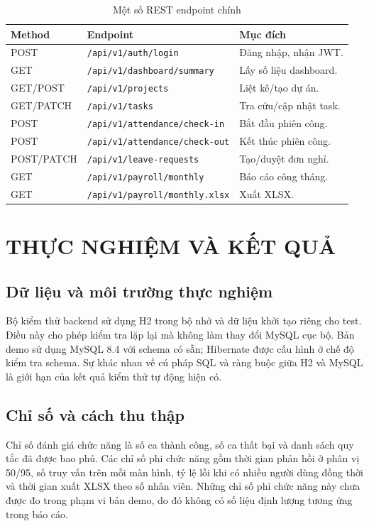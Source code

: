 \documentclass[12pt,a4paper,oneside]{report}
\newcommand{\code}[1]{\texttt{#1}}
\begin{document}
\begin{table}[H]\centering\caption{Một số REST endpoint chính}
\begin{tabularx}{\textwidth}{p{2cm}p{6cm}X}\toprule\textbf{Method}&\textbf{Endpoint}&\textbf{Mục đích}\\\midrule
POST&\code{/api/v1/auth/login}&Đăng nhập, nhận JWT.\\
GET&\code{/api/v1/dashboard/summary}&Lấy số liệu dashboard.\\
GET/POST&\code{/api/v1/projects}&Liệt kê/tạo dự án.\\
GET/PATCH&\code{/api/v1/tasks}&Tra cứu/cập nhật task.\\
POST&\code{/api/v1/attendance/check-in}&Bắt đầu phiên công.\\
POST&\code{/api/v1/attendance/check-out}&Kết thúc phiên công.\\
POST/PATCH&\code{/api/v1/leave-requests}&Tạo/duyệt đơn nghỉ.\\
GET&\code{/api/v1/payroll/monthly}&Báo cáo công tháng.\\
GET&\code{/api/v1/payroll/monthly.xlsx}&Xuất XLSX.\\\bottomrule
\end{tabularx}\end{table}

\chapter{THỰC NGHIỆM VÀ KẾT QUẢ}
\section{Dữ liệu và môi trường thực nghiệm}
Bộ kiểm thử backend sử dụng H2 trong bộ nhớ và dữ liệu khởi tạo riêng cho test. Điều này cho phép kiểm tra lặp lại mà không làm thay đổi MySQL cục bộ. Bản demo sử dụng MySQL 8.4 với schema có sẵn; Hibernate được cấu hình ở chế độ kiểm tra schema. Sự khác nhau về cú pháp SQL và ràng buộc giữa H2 và MySQL là giới hạn của kết quả kiểm thử tự động hiện có.

\section{Chỉ số và cách thu thập}
Chỉ số đánh giá chức năng là số ca thành công, số ca thất bại và danh sách quy tắc đã được bao phủ. Các chỉ số phi chức năng gồm thời gian phản hồi ở phân vị 50/95, số truy vấn trên mỗi màn hình, tỷ lệ lỗi khi có nhiều người dùng đồng thời và thời gian xuất XLSX theo số nhân viên. Những chỉ số phi chức năng này chưa được đo trong phạm vi bản demo, do đó không có số liệu định lượng tương ứng trong báo cáo.
\end{document}
